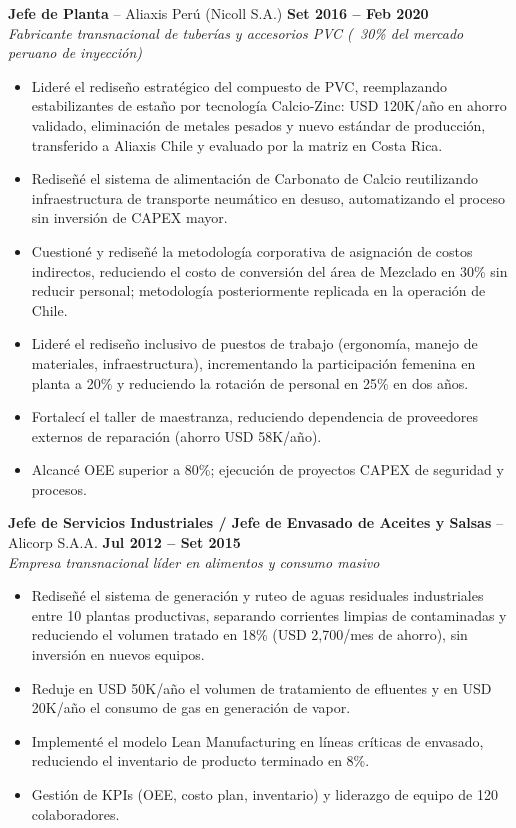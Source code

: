 \documentclass[10pt,a4paper]{article}
\begin{document}
\textbf{Jefe de Planta} -- Aliaxis Per\'u (Nicoll S.A.) \hfill \textbf{Set 2016 -- Feb 2020}\\
\textit{Fabricante transnacional de tuber\'ias y accesorios PVC (~30\% del mercado peruano de inyecci\'on)}
\begin{itemize}
  \item Lider\'e el redise\~no estrat\'egico del compuesto de PVC, reemplazando estabilizantes de estaño por tecnolog\'ia Calcio-Zinc: USD 120K/a\~no en ahorro validado, eliminaci\'on de metales pesados y nuevo est\'andar de producci\'on, transferido a Aliaxis Chile y evaluado por la matriz en Costa Rica.
  \item Redise\~n\'e el sistema de alimentaci\'on de Carbonato de Calcio reutilizando infraestructura de transporte neum\'atico en desuso, automatizando el proceso sin inversi\'on de CAPEX mayor.
  \item Cuestion\'e y redise\~n\'e la metodolog\'ia corporativa de asignaci\'on de costos indirectos, reduciendo el costo de conversi\'on del \'area de Mezclado en 30\% sin reducir personal; metodolog\'ia posteriormente replicada en la operaci\'on de Chile.
  \item Lider\'e el redise\~no inclusivo de puestos de trabajo (ergonom\'ia, manejo de materiales, infraestructura), incrementando la participaci\'on femenina en planta a 20\% y reduciendo la rotaci\'on de personal en 25\% en dos a\~nos.
  \item Fortalec\'i el taller de maestranza, reduciendo dependencia de proveedores externos de reparaci\'on (ahorro USD 58K/a\~no).
  \item Alcanc\'e OEE superior a 80\%; ejecuci\'on de proyectos CAPEX de seguridad y procesos.
\end{itemize}

\textbf{Jefe de Servicios Industriales / Jefe de Envasado de Aceites y Salsas} -- Alicorp S.A.A. \hfill \textbf{Jul 2012 -- Set 2015}\\
\textit{Empresa transnacional l\'ider en alimentos y consumo masivo}
\begin{itemize}
  \item Redise\~n\'e el sistema de generaci\'on y ruteo de aguas residuales industriales entre 10 plantas productivas, separando corrientes limpias de contaminadas y reduciendo el volumen tratado en 18\% (USD 2,700/mes de ahorro), sin inversi\'on en nuevos equipos.
  \item Reduje en USD 50K/a\~no el volumen de tratamiento de efluentes y en USD 20K/a\~no el consumo de gas en generaci\'on de vapor.
  \item Implement\'e el modelo Lean Manufacturing en l\'ineas cr\'iticas de envasado, reduciendo el inventario de producto terminado en 8\%.
  \item Gesti\'on de KPIs (OEE, costo plan, inventario) y liderazgo de equipo de 120 colaboradores.
\end{itemize}
\end{document}
